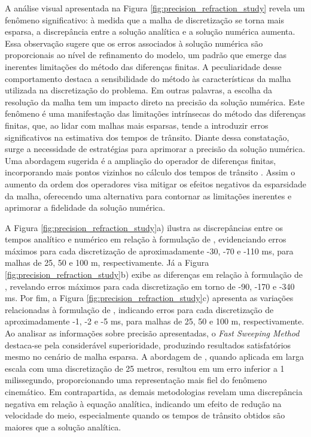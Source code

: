 A análise visual apresentada na Figura \ref{fig:precision_refraction_study} revela um fenômeno significativo: à medida que a malha de discretização se torna mais esparsa, a discrepância entre a solução analítica e a solução numérica aumenta. Essa observação sugere que os erros associados à solução numérica são proporcionais ao nível de refinamento do modelo, um padrão que emerge das inerentes limitações do método das diferenças finitas. A peculiaridade desse comportamento destaca a sensibilidade do método às características da malha utilizada na discretização do problema. Em outras palavras, a escolha da resolução da malha tem um impacto direto na precisão da solução numérica. Este fenômeno é uma manifestação das limitações intrínsecas do método das diferenças finitas, que, ao lidar com malhas mais esparsas, tende a introduzir erros significativos na estimativa dos tempos de trânsito. Diante dessa constatação, surge a necessidade de estratégias para aprimorar a precisão da solução numérica. Uma abordagem sugerida é a ampliação do operador de diferenças finitas, incorporando mais pontos vizinhos no cálculo dos tempos de trânsito \cite{noble2014accurate, cai2023improved}. Assim o aumento da ordem dos operadores visa mitigar os efeitos negativos da esparsidade da malha, oferecendo uma alternativa para contornar as limitações inerentes e aprimorar a fidelidade da solução numérica.

A Figura \ref{fig:precision_refraction_study}a) ilustra as discrepâncias entre os tempos analítico e numérico em relação à formulação de , evidenciando erros máximos para cada discretização de aproximadamente -30, -70 e -110 ms, para malhas de 25, 50 e 100 m, respectivamente. Já a Figura \ref{fig:precision_refraction_study}b) exibe as diferenças em relação à formulação de , revelando erros máximos para cada discretização em torno de -90, -170 e -340 ms. Por fim, a Figura \ref{fig:precision_refraction_study}c) apresenta as variações relacionadas à formulação de , indicando erros para cada discretização de aproximadamente -1, -2 e -5 ms, para malhas de 25, 50 e 100 m, respectivamente. Ao analisar as informações sobre precisão apresentadas, o \textit{Fast Sweeping Method} destaca-se pela considerável superioridade, produzindo resultados satisfatórios mesmo no cenário de malha esparsa. A abordagem de , quando aplicada em larga escala com uma discretização de 25 metros, resultou em um erro inferior a 1 milissegundo, proporcionando uma representação mais fiel do fenômeno cinemático. Em contrapartida, as demais metodologias revelam uma discrepância negativa em relação à equação analítica, indicando um efeito de redução na velocidade do meio, especialmente quando os tempos de trânsito obtidos são maiores que a solução analítica. 


